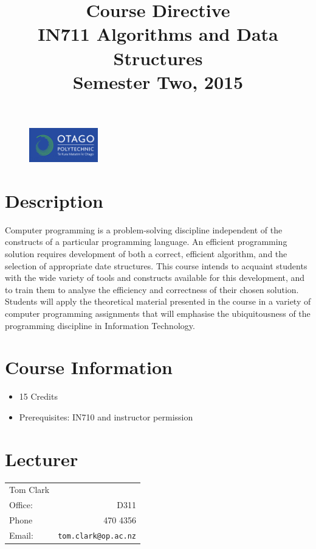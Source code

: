 \documentclass{article}
\begin{document}
\begin{figure}
\includegraphics[width=30mm]{../../../resources/images/oplogo.png}
\end{figure}

\title{Course Directive\\IN711 Algorithms and Data Structures\\Semester Two, 2015}
\date{}
\maketitle

\section*{Description}
Computer programming is a problem-solving discipline independent of the constructs of a particular programming language. An efficient programming solution requires development of both a correct, efficient algorithm, and the selection of appropriate date structures. This course intends to acquaint students with the wide variety of tools and constructs available for this development, and to train them to analyse the efficiency and correctness of their chosen solution.  Students will apply the theoretical material presented in the course in a variety of computer programming assignments that will emphasise the ubiquitousness of the programming discipline in Information Technology.

\section*{Course Information}
\begin{itemize}
  \item 15 Credits
  \item Prerequisites: IN710 and instructor permission
\end{itemize}

\section*{Lecturer}
\begin{tabular}{lr}

  Tom Clark &    \\
     Office: & D311 \\
     Phone & 470 4356 \\
     Email: & \texttt{tom.clark@op.ac.nz} \\
\end{tabular}
\end{document}
